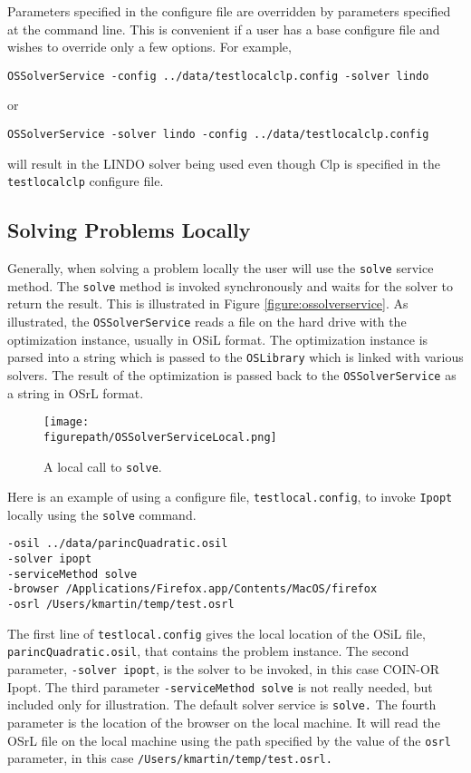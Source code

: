 \documentclass[11pt]{article}
\newcommand{\figurepath}{./figures}
\newcounter{Fig}
\renewcommand{\_}{{\char"5F}}
\renewcommand{\{}{{\char"7B}}
\renewcommand{\}}{{\char"7D}}
\renewcommand{\^}{{\char"0D}}
\renewcommand{\'}{{\char"0D}}
\begin{document}
Parameters specified in the configure file are overridden by parameters specified at the command line. This is convenient if a user has a base configure file and wishes to override only a few options. For example,
\begin{verbatim}
OSSolverService -config ../data/testlocalclp.config -solver lindo
\end{verbatim}
or
\begin{verbatim}
OSSolverService -solver lindo -config ../data/testlocalclp.config 
\end{verbatim}
will result in the LINDO solver being used even though Clp is specified in the {\tt testlocalclp} configure file.



\subsection{Solving Problems Locally}

Generally, when solving a problem locally the user will use the {\tt solve} service method. The {\tt solve} method is invoked synchronously and waits for the solver to return the result.  This is illustrated in Figure \ref{figure:ossolverservice}. As illustrated, the {\tt OSSolverService} reads a file on the hard drive with the optimization instance, usually in OSiL format. The optimization instance is parsed into a string which is passed to the {\tt OSLibrary} which is linked with various solvers. The result of the optimization is passed back to the {\tt OSSolverService} as a string in OSrL format.  



\begin{figure}
\centering
\texttt{[image: \\figurepath/OSSolverServiceLocal.png]}
\caption{A local call to {\tt solve}.} 
\label{figure:ossolverservicelocal}
\end{figure}



Here is an example of using a configure file,  {\tt testlocal.config}, to invoke {\tt Ipopt} locally using the {\tt solve} command.

\begin{verbatim}
-osil ../data/parincQuadratic.osil
-solver ipopt
-serviceMethod solve
-browser /Applications/Firefox.app/Contents/MacOS/firefox
-osrl /Users/kmartin/temp/test.osrl
\end{verbatim}



The first line of {\tt testlocal.config} gives the local location of the OSiL file, {\tt parincQuadratic.osil}, that contains the problem instance. The second parameter, {\tt -solver ipopt},  is the solver to be invoked, in this case COIN-OR Ipopt. The third parameter {\tt -serviceMethod solve} is not really needed, but included only for illustration. The default  solver service is {\tt solve.}  The fourth parameter is the location of the browser on the local machine. It will read the OSrL file on the local machine using the path specified by the value of the {\tt osrl} parameter, in this case {\tt /Users/kmartin/temp/test.osrl.}
\end{document}
